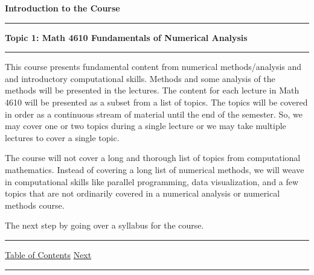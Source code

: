 \documentclass[10pt,fleqn]{article}
\begin{document}
\noindent
{\bf{\Large Introduction to the Course }}
\vskip0.1in\hrule\vskip0.1in
\noindent
{\bf Topic 1: Math 4610 Fundamentals of Numerical Analysis} 
\vskip0.1in\hrule\vskip0.1in
\noindent
This course presents fundamental content from numerical methods/analysis and
and introductory computational skills. Methods and some analysis of the methods
will be presented in the lectures. The content for each lecture in Math 4610
will be presented as a subset from a list of topics. The topics will be covered
in order as a continuous stream of material until the end of the semester. So,
we may cover one or two topics during a single lecture or we may take multiple
lectures to cover a single topic.

The course will not cover a long and thorough list of topics from computational
mathematics. Instead of covering a long list of numerical methods, we will weave
in computational skills like parallel programming, data visualization, and a few
topics that are not ordinarily covered in a numerical analysis or numerical
methods course.

The next step by going over a syllabus for the course.

\vskip0.1in\hrule\vskip0.1in \noindent
  \href{../../guided_notes/topics/toc/pdf/embed_toc.md}{} \|
  \href{./embed_xx.md}{Table of Contents} \|
  \href{./embed_xx.md}{Next}
\vskip0.1in\hrule\vskip0.1in \noindent

\end{document}
